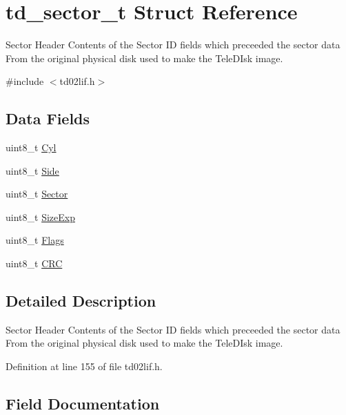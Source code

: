 \hypertarget{structtd__sector__t}{}\section{td\+\_\+sector\+\_\+t Struct Reference}
\label{structtd__sector__t}


Sector Header Contents of the Sector ID fields which preceeded the sector data From the original physical disk used to make the Tele\+D\+Isk image.  




{\ttfamily \#include $<$td02lif.\+h$>$}

\subsection*{Data Fields}
\begin{DoxyCompactItemize}
\item 
uint8\+\_\+t \hyperlink{structtd__sector__t_afddd9f1e3a41cc6e3a9be2478cd3305b}{Cyl}
\item 
uint8\+\_\+t \hyperlink{structtd__sector__t_ae8f05b8d6e903e618f6adec8973221f7}{Side}
\item 
uint8\+\_\+t \hyperlink{structtd__sector__t_a703252220f745cd6adfedadd5cc993d6}{Sector}
\item 
uint8\+\_\+t \hyperlink{structtd__sector__t_addc6d434740a76aebde544a9beab1b6b}{Size\+Exp}
\item 
uint8\+\_\+t \hyperlink{structtd__sector__t_ad30cfc0c6589ff25f8456ada5b352efa}{Flags}
\item 
uint8\+\_\+t \hyperlink{structtd__sector__t_aaccfa1ee85151410b042457fc5b584e5}{C\+RC}
\end{DoxyCompactItemize}


\subsection{Detailed Description}
Sector Header Contents of the Sector ID fields which preceeded the sector data From the original physical disk used to make the Tele\+D\+Isk image. 

Definition at line 155 of file td02lif.\+h.



\subsection{Field Documentation}
\mbox{\label{structtd__sector__t_aaccfa1ee85151410b042457fc5b584e5}} 
